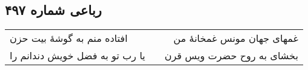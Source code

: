 \begin{center}
\section*{رباعی شماره ۴۹۷}
\label{sec:sh497}
\begin{longtable}{l p{0.5cm} r}
افتاده منم به گوشهٔ بیت حزن
&&
غمهای جهان مونس غمخانهٔ من
\\
یا رب تو به فضل خویش دندانم را
&&
بخشای به روح حضرت ویس قرن
\\
\end{longtable}
\end{center}
